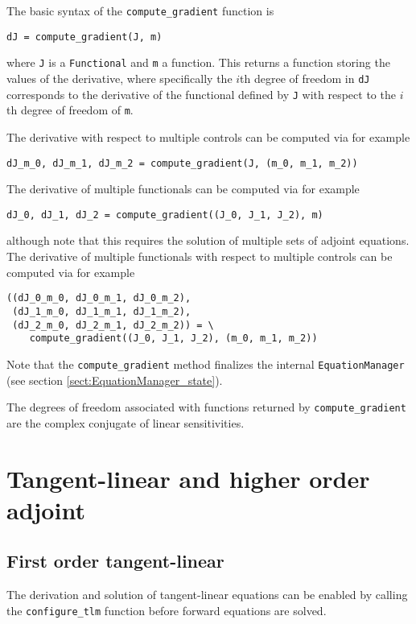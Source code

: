 \documentclass[11pt]{article}
\begin{document}
The basic syntax of the \texttt{compute\_gradient} function is
\begin{lstlisting}
dJ = compute_gradient(J, m)
\end{lstlisting}
where \texttt{J} is a \texttt{Functional} and \texttt{m} a function. This
returns a function storing the values of the derivative, where specifically the
$i$th degree of freedom in \texttt{dJ} corresponds to the derivative of the
functional defined by \texttt{J} with respect to the $i$th degree of freedom of
\texttt{m}.

The derivative with respect to multiple controls can be computed via for
example
\begin{lstlisting}
dJ_m_0, dJ_m_1, dJ_m_2 = compute_gradient(J, (m_0, m_1, m_2))
\end{lstlisting}
The derivative of multiple functionals can be computed via for example
\begin{lstlisting}
dJ_0, dJ_1, dJ_2 = compute_gradient((J_0, J_1, J_2), m)
\end{lstlisting}
although note that this requires the solution of multiple sets of adjoint
equations. The derivative of multiple functionals with respect to multiple
controls can be computed via for example
\begin{lstlisting}
((dJ_0_m_0, dJ_0_m_1, dJ_0_m_2),
 (dJ_1_m_0, dJ_1_m_1, dJ_1_m_2),
 (dJ_2_m_0, dJ_2_m_1, dJ_2_m_2)) = \
    compute_gradient((J_0, J_1, J_2), (m_0, m_1, m_2))
\end{lstlisting}

Note that the \texttt{compute\_gradient} method finalizes the internal
\texttt{EquationManager} (see section \ref{sect:EquationManager_state}).

The degrees of freedom associated with functions returned by
\texttt{compute\_gradient} are the complex conjugate of linear sensitivities.

\section{Tangent-linear and higher order adjoint}\label{sect:higher_order}

\subsection{First order tangent-linear}

The derivation and solution of tangent-linear equations can be enabled by
calling the \texttt{configure\_tlm} function before forward equations are
solved.
\end{document}
